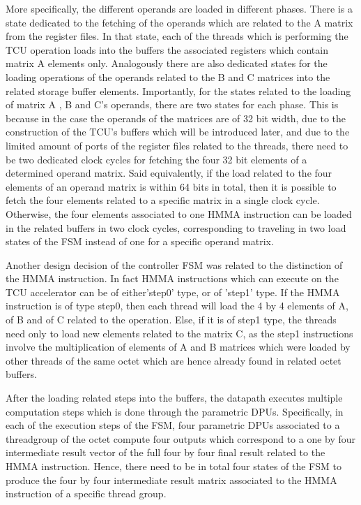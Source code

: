 More specifically, the different operands are loaded in different phases. There is a state dedicated to the fetching of the operands which are related to the A matrix from the register files. In that state, each of the threads which is performing the TCU operation loads into the buffers the associated registers which contain matrix A elements only. Analogously there are also dedicated states for the loading operations of the operands related to the B and C matrices into the related storage buffer elements. Importantly, for the states related to the loading of matrix A , B and C's operands, there are two states for each phase. This is because in the case the operands of the matrices are of 32 bit width, due to the construction of the TCU's buffers which will be introduced later, and due to the limited amount of ports of the register files related to the threads, there need to be two dedicated clock cycles for fetching the four 32 bit elements of a determined operand matrix. Said equivalently, if the load related to the four elements of an operand matrix is within 64 bits in total, then it is possible to fetch the four elements related to a specific matrix in a single clock cycle. Otherwise, the four elements associated to one HMMA instruction can be loaded in the related buffers in two clock cycles, corresponding to traveling in two load states of the FSM instead of one for a specific operand matrix. 

Another design decision of the controller FSM was related to the distinction of the HMMA instruction. In fact HMMA instructions which can execute on the TCU accelerator can be of either'step0' type, or of 'step1' type. If the HMMA instruction is of type step0, then each thread will load the 4 by 4 elements of A, of B and of C related to the operation. Else, if it is of step1 type, the threads need only to load new elements related to the matrix C, as the step1 instructions involve the multiplication of elements of A and B matrices which were loaded by other threads of the same octet which are hence already found in related octet buffers.  

After the loading related steps into the buffers, the datapath executes multiple computation steps which is done through the parametric DPUs. Specifically, in each of the execution steps of the FSM, four parametric DPUs associated to a threadgroup of the octet compute four outputs which correspond to a one by four intermediate result vector of the full four by four final result related to the HMMA instruction. Hence, there need to be in total four states of the FSM to produce the four by four intermediate result matrix associated to the HMMA instruction of a specific thread group. 

